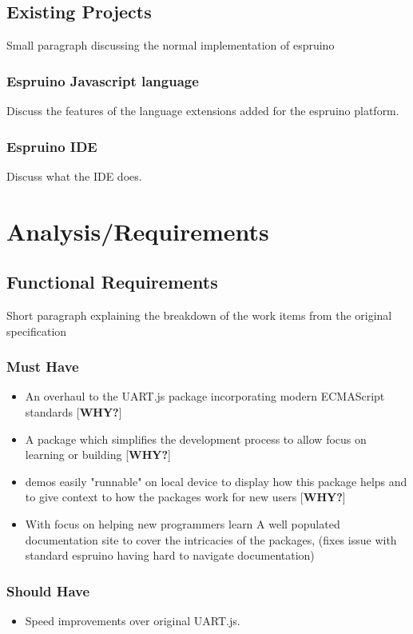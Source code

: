 \documentclass{l4proj}
\begin{document}
\section{Existing Projects}
\text Small paragraph discussing the normal implementation of espruino

\subsection{Espruino Javascript language}
Discuss the features of the language extensions added for the espruino platform.

\subsection{Espruino IDE}
Discuss what the IDE does.


\chapter{Analysis/Requirements}
\section{Functional Requirements}
Short paragraph explaining the breakdown of the work items from the original specification
\subsection{Must Have}
\begin{itemize}
    \item An overhaul to the UART.js package incorporating modern ECMAScript standards [\textbf{WHY?}]
    \item A package which simplifies the development process to allow focus on learning or building [\textbf{WHY?}]
    \item demos easily "runnable" on local device to display how this package helps and to give context to how the packages work for new users [\textbf{WHY?}]
    \item With focus on helping new programmers learn A well populated documentation site to cover the intricacies of the packages, (fixes issue with standard espruino having hard to navigate documentation)
\end{itemize}
\subsection{Should Have}
\begin{itemize}
    \item Speed improvements over original UART.js.
\end{itemize}
\end{document}
